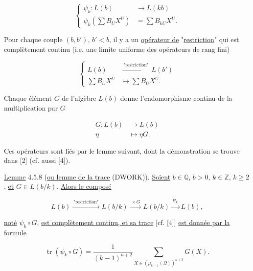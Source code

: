 \begin{equation}\tag{4.5.5}
\left\{
\begin{aligned}
\psi_k:L(b)&\longrightarrow L(kb)\\
\psi_k\!\left(\sum B_UX^U\right)&=\sum B_{kU}X^U.
\end{aligned}
\right.
\end{equation}

Pour chaque couple $(b,b')$, $b'<b$, il y a un
\underline{opérateur de} "\underline{restriction}" qui est complètement continu
(i.e. une limite uniforme des opérateurs de rang fini)

\begin{equation}\tag{4.5.6}
\left\{
\begin{aligned}
L(b)&\xrightarrow{\ \text{"restriction"}\ }L(b')\\
\sum B_UX^U&\longmapsto\sum B_UX^U.
\end{aligned}
\right.
\end{equation}

Chaque élément $G$ de l'algèbre $L(b)$ donne l'endomorphisme continu de la
multiplication par $G$

\begin{equation}\tag{4.5.7}
\begin{aligned}
G:L(b)&\longrightarrow L(b)\\
\eta&\longmapsto\eta G.
\end{aligned}
\end{equation}

Ces opérateurs sont liés par le lemme suivant, dont la démonstration se
trouve dans [2] (cf. aussi [4]).


\underline{Lemme} 4.5.8 (\underline{ou lemme de la trace} (DWORK)).
\underline{Soient} $b\in\mathbb Q$, $b>0$, $k\in\mathbb Z$, $k\geq2$, \underline{et}
$G\in L(b/k)$. \underline{Alors le composé}

\[
L(b)\xrightarrow{\ \text{"restriction"}\ }L(b/k)
\xrightarrow{\ \times G\ }L(b/k)
\xrightarrow{\ \psi_k\ }L(b),
\]

\underline{noté} $\psi_k\circ G$, \underline{est complètement continu, et sa trace}
[cf. [4]] \underline{est donnée par la formule}

\begin{equation}\tag{4.5.9}
\operatorname{tr}(\psi_k\circ G)
=\frac1{(k-1)^{n+2}}
\sum_{X\in(\mu_{k-1}(\Omega))^{n+3}}G(X).
\end{equation}

